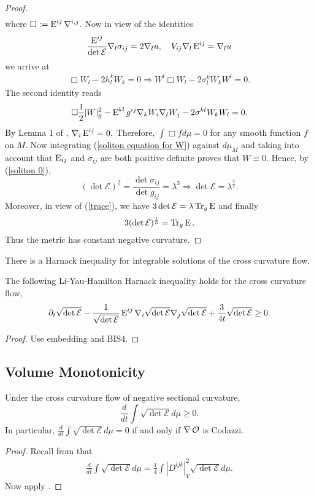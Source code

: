 \documentclass[a4paper, 12pt]{amsart}
\begin{document}
\begin{proof}
\begin{align}
\end{align}
where \(\Box:=\operatorname{E}^{ij}\nabla^{i,j}.\)
Now in view of the identities
\begin{equation}\label{eq0}
\frac{\operatorname{E}^{ij}}{\det \mathcal{E}}\nabla_l\sigma_{ij}=2\nabla_lu,\quad V_{ij}\nabla_l\operatorname{E}^{ij}=\nabla_lu
\end{equation}
we arrive at
\begin{align}
\Box W_l-2h_l^kW_k=0\Rightarrow W^l\Box W_l-2\sigma_l^kW_kW^l=0.
\end{align}
The second identity reads
\begin{align}\label{soliton equation for W}
\Box \frac{1}{2}|W|_g^2-\operatorname{E}^{kl}g^{ij}\nabla_kW_i\nabla_lW_j-2\sigma^{kl}W_kW_l=0.
\end{align}
By Lemma 1 of \cite{MR2055396}, $\nabla_i\operatorname{E}^{ij}=0.$ Therefore, $\int \Box fd\mu=0$ for any smooth function $f$ on $M$.
Now integrating (\ref{soliton equation for W}) against $d\mu_{M}$ and taking into account that $\operatorname{E}_{ij}$ and $\sigma_{ij}$ are both positive definite proves that $W\equiv0$. Hence, by (\ref{soliton 0}),
\[(\det \mathcal{E})^2=\frac{\det \sigma_{ij}}{\det g_{ij}}=\lambda ^3\Rightarrow \det \mathcal{E}=\lambda^{\frac{3}{2}}.\]
Moreover, in view of (\ref{trace}), we have $3\det \mathcal{E}=\lambda \operatorname{Tr}_g \operatorname{E}$ and finally \[3(\det \mathcal{E})^{\frac{1}{3}}=\operatorname{Tr}_g \operatorname{E}.\] Thus the metric has constant negative curvature.
\end{proof}
There is a Harnack inequality for integrable solutions of the cross curvature flow.
\begin{lemma}
\label{lem:harnack}
The following Li-Yau-Hamilton Harnack inequality holds for the cross curvature flow,
\[
\partial_t \sqrt{\det \mathcal{E}}-\frac{1}{\sqrt{\det \mathcal{E}}}\operatorname{E}^{ij}\nabla_i\sqrt{\det \mathcal{E}}\nabla_j\sqrt{\det \mathcal{E}}+\frac{3}{4t}\sqrt{\det \mathcal{E}}\geq0.
\]
\end{lemma}
\begin{proof}
{\color{red}Use embedding and BIS4.}
\end{proof}
\subsection{Volume Monotonicity}
\label{subsec:xcf_volume}

\begin{lemma}
\label{lem:volume_monotonicity}
Under the cross curvature flow of negative sectional curvature,
\[
\frac{d}{dt}\int \sqrt{\det \mathcal{E}}d\mu \geq 0.
\]
In particular, \(\frac{d}{dt} \int \sqrt{\det \mathcal{E}}d\mu = 0\) if and only if \(\nabla \operatorname{\mathcal{O}}\) is Codazzi.
\end{lemma}
\begin{proof}
Recall from \cite[page 6]{MR2055396} that
\begin{align}
\frac{d}{dt}\int \sqrt{\det \mathcal{E}}d\mu=\frac{1}{4}\int |D^{ijk}|_V^2\sqrt{\det \mathcal{E}}d\mu.
\end{align}
Now apply .
\end{proof}
\end{document}
